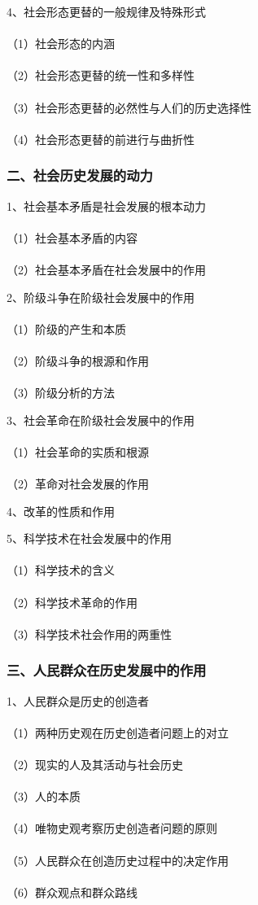 \documentclass{ctexart}
\begin{document}
4、社会形态更替的一般规律及特殊形式
\\\\
（1）社会形态的内涵
\\\\
（2）社会形态更替的统一性和多样性
\\\\
（3）社会形态更替的必然性与人们的历史选择性
\\\\
（4）社会形态更替的前进行与曲折性
\subsubsection{二、社会历史发展的动力}
1、社会基本矛盾是社会发展的根本动力
\\\\
（1）社会基本矛盾的内容
\\\\
（2）社会基本矛盾在社会发展中的作用

2、阶级斗争在阶级社会发展中的作用
\\\\
（1）阶级的产生和本质
\\\\
（2）阶级斗争的根源和作用
\\\\
（3）阶级分析的方法

3、社会革命在阶级社会发展中的作用
\\\\
（1）社会革命的实质和根源
\\\\
（2）革命对社会发展的作用

4、改革的性质和作用

5、科学技术在社会发展中的作用
\\\\
（1）科学技术的含义
\\\\
（2）科学技术革命的作用
\\\\
（3）科学技术社会作用的两重性
\subsubsection{三、人民群众在历史发展中的作用}
1、人民群众是历史的创造者
\\\\
（1）两种历史观在历史创造者问题上的对立
\\\\
（2）现实的人及其活动与社会历史
\\\\
（3）人的本质
\\\\
（4）唯物史观考察历史创造者问题的原则
\\\\
（5）人民群众在创造历史过程中的决定作用
\\\\
（6）群众观点和群众路线
\end{document}
